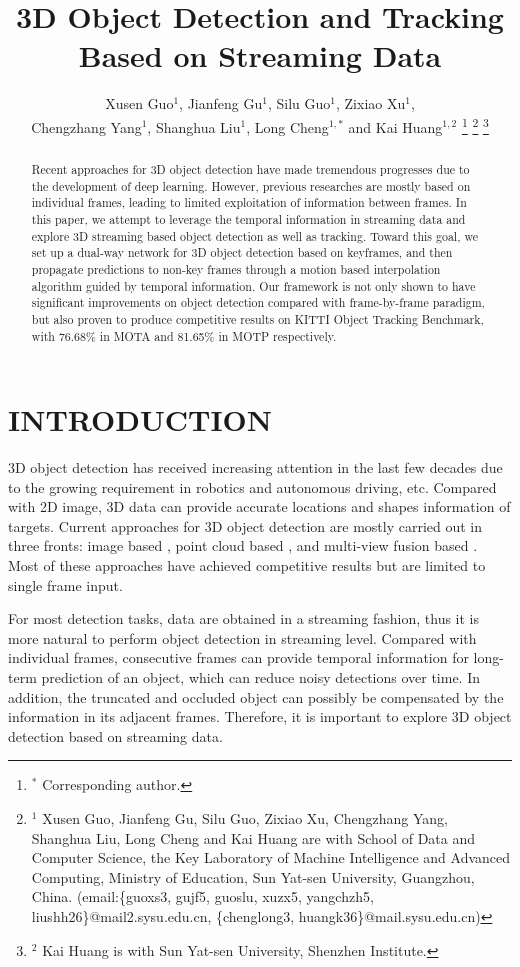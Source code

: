 \documentclass[letterpaper, 10pt, conference]{ieeeconf}  %
\title{\LARGE \bf 3D Object Detection and Tracking Based on Streaming Data}
\author{Xusen Guo$^{1}$, Jianfeng Gu$^{1}$, Silu Guo$^{1}$, Zixiao Xu$^{1}$,\\ Chengzhang Yang$^{1}$, Shanghua Liu$^{1}$, Long Cheng$^{1,*}$ and Kai Huang$^{1,2}$ 
\thanks{$^{*}$ Corresponding author.}
\thanks{$^{1}$ Xusen Guo, Jianfeng Gu, Silu Guo, Zixiao Xu, Chengzhang Yang, Shanghua Liu, Long Cheng and Kai Huang are with School of Data and Computer Science, the Key Laboratory of Machine Intelligence and Advanced Computing, Ministry of Education, Sun Yat-sen University, Guangzhou, China. (email:\{guoxs3, gujf5, guoslu, xuzx5, yangchzh5, liushh26\}@mail2.sysu.edu.cn, \{chenglong3, huangk36\}@mail.sysu.edu.cn)}
\thanks{$^{2}$ Kai Huang is with Sun Yat-sen University, Shenzhen Institute.}}
\begin{document}
\maketitle

\def\eg{\emph{e.g.}}
\def\Eg{\emph{E.g.}}
\def\etal{\emph{et al. }}
\def\figurename{\emph{Fig. }}
\def\tablename{\emph{TABLE}}

\thispagestyle{empty}
\pagestyle{empty}


\begin{abstract}
Recent approaches for 3D object detection have made tremendous progresses due to the development of deep learning. However, previous researches are mostly based on individual frames, leading to limited exploitation of information between frames. In this paper, we attempt to leverage the temporal information in streaming data and explore 3D streaming based object detection as well as tracking. Toward this goal, we set up a dual-way network for 3D object detection based on keyframes, and then propagate predictions to non-key frames through a motion based interpolation algorithm guided by temporal information. Our framework is not only shown to have significant improvements on object detection compared with frame-by-frame paradigm, but also proven to produce competitive results on KITTI Object Tracking Benchmark, with 76.68\% in MOTA and 81.65\% in MOTP respectively.
\end{abstract}

\section{INTRODUCTION}

3D object detection has received increasing attention in the last few decades due to the growing requirement in robotics and autonomous driving, etc. Compared with 2D image, 3D data can provide accurate locations and shapes information of targets. Current approaches for 3D object detection are mostly carried out in three fronts: image based \cite{7780605, chen20183d}, point cloud based \cite{zhou2018voxelnet,yang2018pixor,simon2018complex}, and multi-view fusion based \cite{chen2017multi,ku2018joint}. Most of these approaches have achieved competitive results but are limited to single frame input.

For most detection tasks, data are obtained in a streaming fashion, thus it is more natural to perform object detection in streaming level. Compared with individual frames, consecutive frames can provide temporal information for long-term prediction of an object, which can reduce noisy detections over time. In addition, the truncated and occluded object can possibly be compensated by the information in its adjacent frames. Therefore, it is important to explore 3D object detection based on streaming data.
\end{document}
